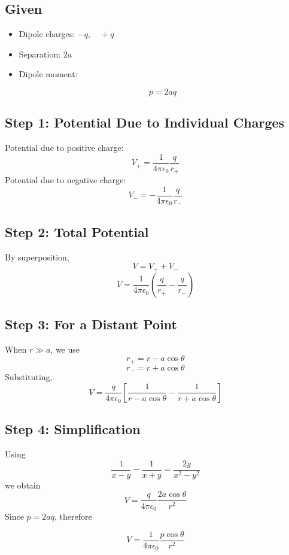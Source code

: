 \documentclass[11pt,a4paper]{article}
\begin{document}
\subsection*{Given}
\begin{itemize}
    \item Dipole charges: \( -q, \quad +q \)
    \item Separation: \( 2a \)
    \item Dipole moment:
    \begin{tcolorbox}[colback=RoyalBlue!5!white, colframe=RoyalBlue]
        \[ p = 2aq \]
    \end{tcolorbox}
\end{itemize}

\subsection*{Step 1: Potential Due to Individual Charges}
Potential due to positive charge:
\[ V_+ = \frac{1}{4\pi\epsilon_0} \frac{q}{r_+} \]
Potential due to negative charge:
\[ V_- = -\frac{1}{4\pi\epsilon_0} \frac{q}{r_-} \]

\subsection*{Step 2: Total Potential}
By superposition,
\[ V = V_+ + V_- \]
\[ V = \frac{1}{4\pi\epsilon_0} \left( \frac{q}{r_+} - \frac{q}{r_-} \right) \]

\subsection*{Step 3: For a Distant Point}
When \( r \gg a \), we use
\[ r_+ = r - a\cos\theta \]
\[ r_- = r + a\cos\theta \]
Substituting,
\[ V = \frac{q}{4\pi\epsilon_0} \left[ \frac{1}{r - a\cos\theta} - \frac{1}{r + a\cos\theta} \right] \]

\subsection*{Step 4: Simplification}
Using
\[ \frac{1}{x-y} - \frac{1}{x+y} = \frac{2y}{x^2-y^2} \]
we obtain
\[ V = \frac{q}{4\pi\epsilon_0} \frac{2a\cos\theta}{r^2} \]
Since \( p = 2aq \), therefore
\begin{tcolorbox}[colback=RoyalBlue!5!white, colframe=RoyalBlue]
    \[ V = \frac{1}{4\pi\epsilon_0} \frac{p\cos\theta}{r^2} \]
\end{tcolorbox}
\end{document}
